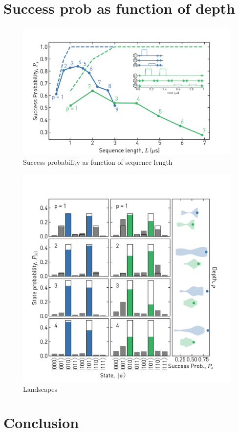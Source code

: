 \section{Success prob as function of depth}


\begin{figure}[ht]
    \centering
    \includegraphics[width=\textwidth]{chapters/qaoa/figs/ch5_qaoa_sequence_lengths_v1_withinset_20200202_120000.png}
    \caption{Success probability as function of sequence length}
    \label{fig:qaoa_sequence_lengths}
\end{figure}

\begin{figure}[ht]
    \centering
    \includegraphics[width=\textwidth]{chapters/qaoa/figs/ch5_qaoa_state_histograms_20200202_134816.pdf}
    \caption{Landscapes}
    \label{fig:qaoa_state_histogram}
\end{figure}
\section{Conclusion}
